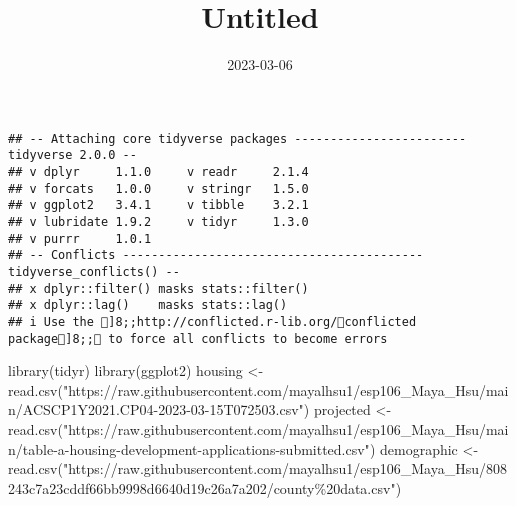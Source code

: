 \documentclass[
]{article}
\title{Untitled}
\author{}
\date{\vspace{-2.5em}2023-03-06}
\newenvironment{Shaded}{\begin{snugshade}}{\end{snugshade}}
\newcommand{\AttributeTok}[1]{\textcolor[rgb]{0.77,0.63,0.00}{#1}}
\newcommand{\ConstantTok}[1]{\textcolor[rgb]{0.00,0.00,0.00}{#1}}
\newcommand{\FunctionTok}[1]{\textcolor[rgb]{0.00,0.00,0.00}{#1}}
\newcommand{\NormalTok}[1]{#1}
\newcommand{\OtherTok}[1]{\textcolor[rgb]{0.56,0.35,0.01}{#1}}
\newcommand{\SpecialCharTok}[1]{\textcolor[rgb]{0.00,0.00,0.00}{#1}}
\newcommand{\StringTok}[1]{\textcolor[rgb]{0.31,0.60,0.02}{#1}}
\begin{document}
\maketitle

\begin{Shaded}
\end{Shaded}

\begin{verbatim}
## -- Attaching core tidyverse packages ------------------------ tidyverse 2.0.0 --
## v dplyr     1.1.0     v readr     2.1.4
## v forcats   1.0.0     v stringr   1.5.0
## v ggplot2   3.4.1     v tibble    3.2.1
## v lubridate 1.9.2     v tidyr     1.3.0
## v purrr     1.0.1     
## -- Conflicts ------------------------------------------ tidyverse_conflicts() --
## x dplyr::filter() masks stats::filter()
## x dplyr::lag()    masks stats::lag()
## i Use the ]8;;http://conflicted.r-lib.org/conflicted package]8;; to force all conflicts to become errors
\end{verbatim}

\begin{Shaded}
\begin{Highlighting}[]
\FunctionTok{library}\NormalTok{(tidyr)}
\FunctionTok{library}\NormalTok{(ggplot2)}
\NormalTok{housing }\OtherTok{\textless{}{-}} \FunctionTok{read.csv}\NormalTok{(}\StringTok{"https://raw.githubusercontent.com/mayalhsu1/esp106\_Maya\_Hsu/main/ACSCP1Y2021.CP04{-}2023{-}03{-}15T072503.csv"}\NormalTok{)}
\NormalTok{projected }\OtherTok{\textless{}{-}} \FunctionTok{read.csv}\NormalTok{(}\StringTok{"https://raw.githubusercontent.com/mayalhsu1/esp106\_Maya\_Hsu/main/table{-}a{-}housing{-}development{-}applications{-}submitted.csv"}\NormalTok{)}
\NormalTok{demographic }\OtherTok{\textless{}{-}} \FunctionTok{read.csv}\NormalTok{(}\StringTok{"https://raw.githubusercontent.com/mayalhsu1/esp106\_Maya\_Hsu/808243c7a23cddf66bb9998d6640d19c26a7a202/county\%20data.csv"}\NormalTok{)}
\end{Highlighting}
\end{Shaded}
\end{document}
